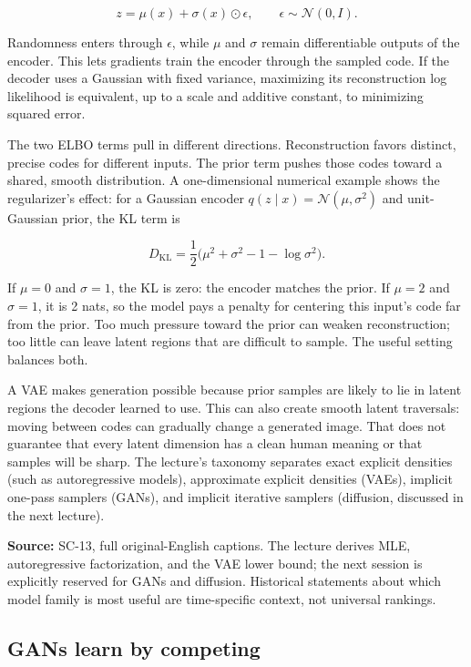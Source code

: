 \[
z=\mu(x)+\sigma(x)\odot\epsilon,\qquad \epsilon\sim\mathcal{N}(0,I).
\]

Randomness enters through \(\epsilon\), while \(\mu\) and \(\sigma\) remain differentiable outputs of the encoder. This lets gradients train the encoder through the sampled code. If the decoder uses a Gaussian with fixed variance, maximizing its reconstruction log likelihood is equivalent, up to a scale and additive constant, to minimizing squared error.

The two ELBO terms pull in different directions. Reconstruction favors distinct, precise codes for different inputs. The prior term pushes those codes toward a shared, smooth distribution. A one-dimensional numerical example shows the regularizer's effect: for a Gaussian encoder \(q(z\mid x)=\mathcal{N}(\mu,\sigma^2)\) and unit-Gaussian prior, the KL term is

\[
D_{\mathrm{KL}}=\frac12\big(\mu^2+\sigma^2-1-\log\sigma^2\big).
\]

If \(\mu=0\) and \(\sigma=1\), the KL is zero: the encoder matches the prior. If \(\mu=2\) and \(\sigma=1\), it is 2 nats, so the model pays a penalty for centering this input's code far from the prior. Too much pressure toward the prior can weaken reconstruction; too little can leave latent regions that are difficult to sample. The useful setting balances both.

A VAE makes generation possible because prior samples are likely to lie in latent regions the decoder learned to use. This can also create smooth latent traversals: moving between codes can gradually change a generated image. That does not guarantee that every latent dimension has a clean human meaning or that samples will be sharp. The lecture's taxonomy separates exact explicit densities (such as autoregressive models), approximate explicit densities (VAEs), implicit one-pass samplers (GANs), and implicit iterative samplers (diffusion, discussed in the next lecture).

\textbf{Source:} SC-13, full original-English captions. The lecture derives MLE, autoregressive factorization, and the VAE lower bound; the next session is explicitly reserved for GANs and diffusion. Historical statements about which model family is most useful are time-specific context, not universal rankings.

\subsection{GANs learn by competing}\label{04-visual-computing-ii-ch031-gans-learn-by-competing}

